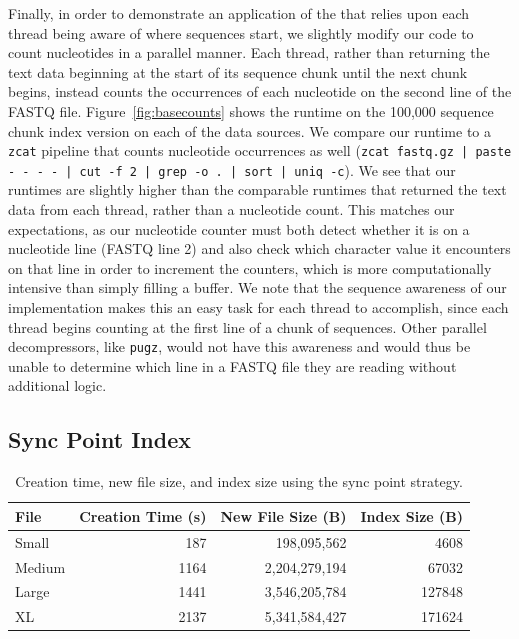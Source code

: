 Finally, in order to demonstrate an application of the \ireader that relies upon
each thread being aware of where sequences start, we slightly modify our code to
count nucleotides in a parallel manner. Each thread, rather than returning the
text data beginning at the start of its sequence chunk until the next chunk
begins, instead counts the occurrences of each nucleotide on the second line of
the FASTQ file. Figure~\ref{fig:basecounts} shows the runtime on the 100,000
sequence chunk index version on each of the data sources. We compare our runtime
to a \texttt{zcat} pipeline that counts nucleotide occurrences as well
(\eg \texttt{zcat fastq.gz | paste - - - - | cut -f 2 | grep
-o . | sort | uniq -c}). We see that our runtimes are slightly higher than the
comparable runtimes that returned the text data from each thread, rather than a
nucleotide count. This matches our expectations, as our nucleotide counter must
both detect whether it is on a nucleotide line (FASTQ line 2) and also check
which character value it encounters on that line in order to increment the
counters, which is more computationally intensive than simply filling a buffer.
We note that the sequence awareness of our implementation makes this an easy
task for each thread to accomplish, since each thread begins counting at the
first line of a chunk of sequences. Other parallel \gzip decompressors, like
\texttt{pugz}, would not have this awareness and would thus be unable to
determine which line in a FASTQ file they are reading without additional logic.

\subsection{Sync Point Index}

\begin{table}[ht]
    \centering
    \caption{Creation time, new file size, and index size using the sync point
    strategy.}
\begin{tabular}{l|r|r|r}
   
    File & Creation Time (s) & New File Size (B) & Index Size (B)\\
    \hline
    Small & 187 & 198,095,562 &  4608\\
    Medium & 1164 & 2,204,279,194 &  67032\\
    Large & 1441 &  3,546,205,784 &127848\\
    XL & 2137 & 5,341,584,427 & 171624\\
\end{tabular}
    \label{tab:sync}
\end{table}


